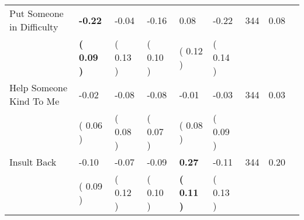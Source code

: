 \begin{tabular}{L{6.2cm} C{1.8cm} C{1.8cm} C{1.8cm} C{1.8cm} C{1.8cm} C{1.8cm} C{0.3cm} C{0.3cm}}
Put Someone in Difficulty & \textbf{    -0.22} &     -0.04 &     -0.16 &      0.08 &     -0.22  & 344 &       0.08 \\ 
 & \textbf{(     0.09 )} & (     0.13 ) & (     0.10 ) & (     0.12 ) & (     0.14 )  & \\
Help Someone Kind To Me &     -0.02 &     -0.08 &     -0.08 &     -0.01 &     -0.03  & 344 &       0.03 \\ 
 & (     0.06 ) & (     0.08 ) & (     0.07 ) & (     0.08 ) & (     0.09 )  & \\
Insult Back &     -0.10 &     -0.07 &     -0.09 & \textbf{     0.27} &     -0.11  & 344 &       0.20 \\ 
 & (     0.09 ) & (     0.12 ) & (     0.10 ) & \textbf{(     0.11 )} & (     0.13 )  & \\
\bottomrule
\end{tabular}

